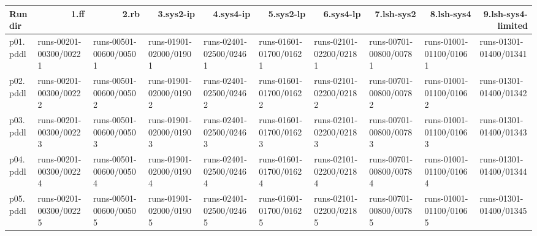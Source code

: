 \documentclass{article}
\begin{document}
\begin{tabular}{@{}lrrrrrrrrr@{}}
Run dir & 1.ff & 2.rb & 3.sys2-ip & 4.sys4-ip & 5.sys2-lp & 6.sys4-lp & 7.lsh-sys2 & 8.lsh-sys4 & 9.lsh-sys4-limited \\
\midrule
p01.pddl & \multicolumn{1}{|l|}{runs-00201-00300/00221} & \multicolumn{1}{|l|}{runs-00501-00600/00501} & \multicolumn{1}{|l|}{runs-01901-02000/01901} & \multicolumn{1}{|l|}{runs-02401-02500/02461} & \multicolumn{1}{|l|}{runs-01601-01700/01621} & \multicolumn{1}{|l|}{runs-02101-02200/02181} & \multicolumn{1}{|l|}{runs-00701-00800/00781} & \multicolumn{1}{|l|}{runs-01001-01100/01061} & \multicolumn{1}{|l|}{runs-01301-01400/01341} \\
p02.pddl & \multicolumn{1}{|l|}{runs-00201-00300/00222} & \multicolumn{1}{|l|}{runs-00501-00600/00502} & \multicolumn{1}{|l|}{runs-01901-02000/01902} & \multicolumn{1}{|l|}{runs-02401-02500/02462} & \multicolumn{1}{|l|}{runs-01601-01700/01622} & \multicolumn{1}{|l|}{runs-02101-02200/02182} & \multicolumn{1}{|l|}{runs-00701-00800/00782} & \multicolumn{1}{|l|}{runs-01001-01100/01062} & \multicolumn{1}{|l|}{runs-01301-01400/01342} \\
p03.pddl & \multicolumn{1}{|l|}{runs-00201-00300/00223} & \multicolumn{1}{|l|}{runs-00501-00600/00503} & \multicolumn{1}{|l|}{runs-01901-02000/01903} & \multicolumn{1}{|l|}{runs-02401-02500/02463} & \multicolumn{1}{|l|}{runs-01601-01700/01623} & \multicolumn{1}{|l|}{runs-02101-02200/02183} & \multicolumn{1}{|l|}{runs-00701-00800/00783} & \multicolumn{1}{|l|}{runs-01001-01100/01063} & \multicolumn{1}{|l|}{runs-01301-01400/01343} \\
p04.pddl & \multicolumn{1}{|l|}{runs-00201-00300/00224} & \multicolumn{1}{|l|}{runs-00501-00600/00504} & \multicolumn{1}{|l|}{runs-01901-02000/01904} & \multicolumn{1}{|l|}{runs-02401-02500/02464} & \multicolumn{1}{|l|}{runs-01601-01700/01624} & \multicolumn{1}{|l|}{runs-02101-02200/02184} & \multicolumn{1}{|l|}{runs-00701-00800/00784} & \multicolumn{1}{|l|}{runs-01001-01100/01064} & \multicolumn{1}{|l|}{runs-01301-01400/01344} \\
p05.pddl & \multicolumn{1}{|l|}{runs-00201-00300/00225} & \multicolumn{1}{|l|}{runs-00501-00600/00505} & \multicolumn{1}{|l|}{runs-01901-02000/01905} & \multicolumn{1}{|l|}{runs-02401-02500/02465} & \multicolumn{1}{|l|}{runs-01601-01700/01625} & \multicolumn{1}{|l|}{runs-02101-02200/02185} & \multicolumn{1}{|l|}{runs-00701-00800/00785} & \multicolumn{1}{|l|}{runs-01001-01100/01065} & \multicolumn{1}{|l|}{runs-01301-01400/01345} \\

\end{tabular}
\end{document}
